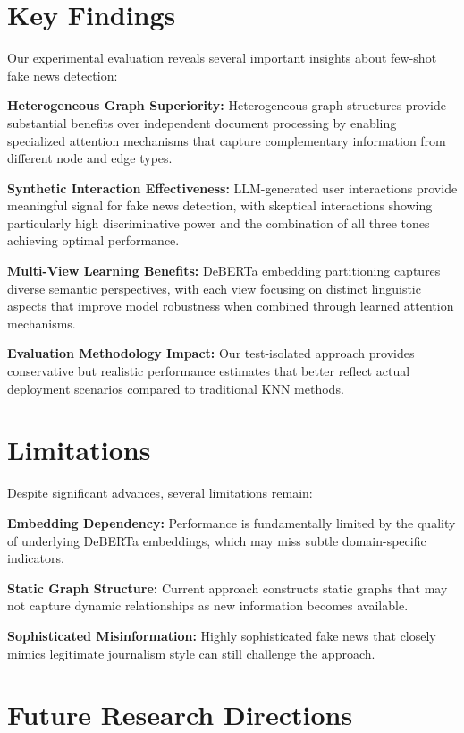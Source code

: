 \section{Key Findings}

Our experimental evaluation reveals several important insights about few-shot fake news detection:

\textbf{Heterogeneous Graph Superiority:} Heterogeneous graph structures provide substantial benefits over independent document processing by enabling specialized attention mechanisms that capture complementary information from different node and edge types.

\textbf{Synthetic Interaction Effectiveness:} LLM-generated user interactions provide meaningful signal for fake news detection, with skeptical interactions showing particularly high discriminative power and the combination of all three tones achieving optimal performance.

\textbf{Multi-View Learning Benefits:} DeBERTa embedding partitioning captures diverse semantic perspectives, with each view focusing on distinct linguistic aspects that improve model robustness when combined through learned attention mechanisms.

\textbf{Evaluation Methodology Impact:} Our test-isolated approach provides conservative but realistic performance estimates that better reflect actual deployment scenarios compared to traditional KNN methods.

\section{Limitations}

Despite significant advances, several limitations remain:

\textbf{Embedding Dependency:} Performance is fundamentally limited by the quality of underlying DeBERTa embeddings, which may miss subtle domain-specific indicators.

\textbf{Static Graph Structure:} Current approach constructs static graphs that may not capture dynamic relationships as new information becomes available.

\textbf{Sophisticated Misinformation:} Highly sophisticated fake news that closely mimics legitimate journalism style can still challenge the approach.

\section{Future Research Directions}


